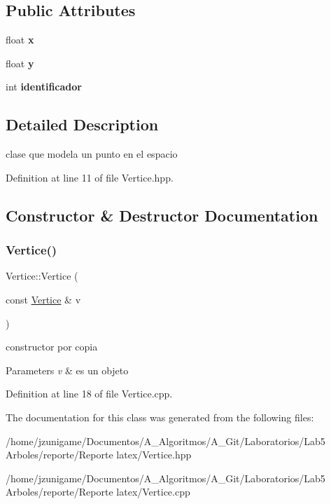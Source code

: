\subsection*{Public Attributes}
\begin{DoxyCompactItemize}
\item 
\mbox{\label{class_vertice_abc7f97df103b9c53bf04e1c6f247c1fc}} 
float {\bfseries x}
\item 
\mbox{\label{class_vertice_aca05e79646b79df75ccf73f07b04d26e}} 
float {\bfseries y}
\item 
\mbox{\label{class_vertice_a923a1c1451729f490b42bbe35bdf20f1}} 
int {\bfseries identificador}
\end{DoxyCompactItemize}


\subsection{Detailed Description}
clase que modela un punto en el espacio 

Definition at line 11 of file Vertice.\+hpp.



\subsection{Constructor \& Destructor Documentation}
\mbox{\label{class_vertice_a8d8f3610b706a9e5d50e1138d9abea90}} 
\subsubsection{\texorpdfstring{Vertice()}{Vertice()}}
{\footnotesize\ttfamily Vertice\+::\+Vertice (\begin{DoxyParamCaption}\item[{const \hyperlink{class_vertice}{Vertice} \&}]{v }\end{DoxyParamCaption})}



constructor por copia 


\begin{DoxyParams}{Parameters}
{\em v} & es un objeto \\
\hline
\end{DoxyParams}


Definition at line 18 of file Vertice.\+cpp.



The documentation for this class was generated from the following files\+:\begin{DoxyCompactItemize}
\item 
/home/jzunigame/\+Documentos/\+A\+\_\+\+Algoritmos/\+A\+\_\+\+Git/\+Laboratorios/\+Lab5 Arboles/reporte/\+Reporte latex/Vertice.\+hpp\item 
/home/jzunigame/\+Documentos/\+A\+\_\+\+Algoritmos/\+A\+\_\+\+Git/\+Laboratorios/\+Lab5 Arboles/reporte/\+Reporte latex/Vertice.\+cpp\end{DoxyCompactItemize}

